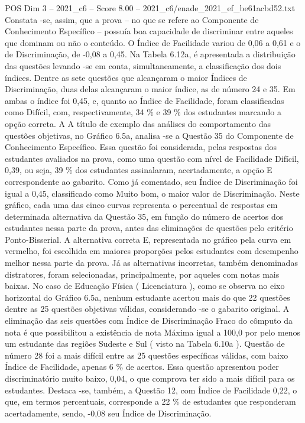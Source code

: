 \begin{textsample}{POS Dim 3 – 2021\_c6 – Score 8.00 – 2021\_c6/enade\_2021\_ef\_be61acbd52.txt}
Constata -se, assim, que a prova – no que se refere ao Componente de Conhecimento Específico – possuía boa capacidade de discriminar entre aqueles que dominam ou não o conteúdo.
O Índice de Facilidade variou de 0,06 a 0,61 e o de Discriminação, de -0,08 a 0,45.
Na Tabela 6.12a, é apresentada a distribuição das questões levando -se em conta, simultaneamente, a classificação dos dois índices.
Dentre as sete questões que alcançaram o maior Índices de Discriminação, duas delas alcançaram o maior índice, as de número 24 e 35.
Em ambas o índice foi 0,45, e, quanto ao Índice de Facilidade, foram classificadas como Difícil, com, respectivamente, 34 \% e 39 \% dos estudantes marcando a opção correta.
A A título de exemplo das análises do comportamento das questões objetivas, no Gráfico 6.5a, analisa -se a Questão 35 do Componente de Conhecimento Específico.
Essa questão foi considerada, pelas respostas dos estudantes avaliados na prova, como uma questão com nível de Facilidade Difícil, 0,39, ou seja, 39 \% dos estudantes assinalaram, acertadamente, a opção E correspondente ao gabarito.
Como já comentado, seu Índice de Discriminação foi igual a 0,45, classificado como Muito bom, o maior valor de Discriminação.
Neste gráfico, cada uma das cinco curvas representa o percentual de respostas em determinada alternativa da Questão 35, em função do número de acertos dos estudantes nessa parte da prova, antes das eliminações de questões pelo critério Ponto-Bisserial.
A alternativa correta E, representada no gráfico pela curva em vermelho, foi escolhida em maiores proporções pelos estudantes com desempenho melhor nessa parte da prova.
Já as alternativas incorretas, também denominadas distratores, foram selecionadas, principalmente, por aqueles com notas mais baixas.
No caso de Educação Física ( Licenciatura ), como se observa no eixo horizontal do Gráfico 6.5a, nenhum estudante acertou mais do que 22 questões dentre as 25 questões objetivas válidas, considerando -se o gabarito original.
A eliminação das seis questões com Índice de Discriminação Fraco do cômputo da nota é que possibilitou a existência de nota Máxima igual a 100,0 por pelo menos um estudante das regiões Sudeste e Sul ( visto na Tabela 6.10a ).
Questão de número 28 foi a mais difícil entre as 25 questões específicas válidas, com baixo Índice de Facilidade, apenas 6 \% de acertos.
Essa questão apresentou poder discriminatório muito baixo, 0,04, o que comprova ter sido a mais difícil para os estudantes.
Destaca -se, também, a Questão 12, com Índice de Facilidade 0,22, o que, em termos percentuais, corresponde a 22 \% de estudantes que responderam acertadamente, sendo, -0,08 seu Índice de Discriminação.

\end{textsample}
